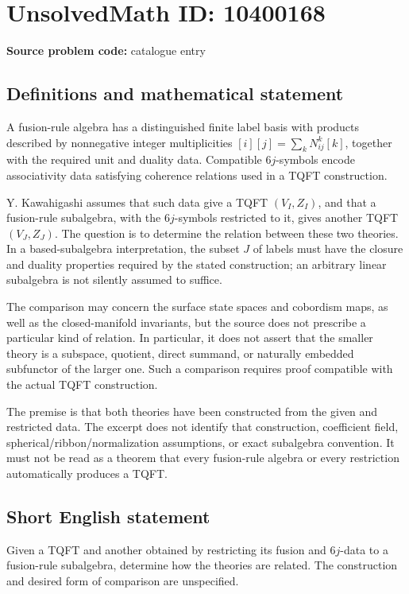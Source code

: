\documentclass[11pt]{article}
\begin{document}
\section*{UnsolvedMath ID: 10400168}
\textbf{Source problem code:} catalogue entry
\subsection{Definitions and mathematical statement}
A fusion-rule algebra has a distinguished finite label basis with products described by nonnegative integer multiplicities \([i][j]=\sum_kN_{ij}^k[k]\), together with the required unit and duality data. Compatible \(6j\)-symbols encode associativity data satisfying coherence relations used in a TQFT construction.

Y. Kawahigashi assumes that such data give a TQFT \((V_I,Z_I)\), and that a fusion-rule subalgebra, with the \(6j\)-symbols restricted to it, gives another TQFT \((V_J,Z_J)\). The question is to determine the relation between these two theories. In a based-subalgebra interpretation, the subset \(J\) of labels must have the closure and duality properties required by the stated construction; an arbitrary linear subalgebra is not silently assumed to suffice.

The comparison may concern the surface state spaces and cobordism maps, as well as the closed-manifold invariants, but the source does not prescribe a particular kind of relation. In particular, it does not assert that the smaller theory is a subspace, quotient, direct summand, or naturally embedded subfunctor of the larger one. Such a comparison requires proof compatible with the actual TQFT construction.

The premise is that both theories have been constructed from the given and restricted data. The excerpt does not identify that construction, coefficient field, spherical/ribbon/normalization assumptions, or exact subalgebra convention. It must not be read as a theorem that every fusion-rule algebra or every restriction automatically produces a TQFT.
\subsection{Short English statement}
Given a TQFT and another obtained by restricting its fusion and \(6j\)-data to a fusion-rule subalgebra, determine how the theories are related. The construction and desired form of comparison are unspecified.
\end{document}
